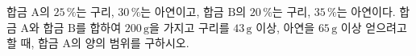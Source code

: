합금 $\mathrm{A}$의 $25\,\%$는 구리, $30\,\%$는 아연이고, 합금 $\mathrm{B}$의 $20\,\%$는 구리, $35\,\%$는 아연이다. 합금 $\mathrm{A}$와 합금 $\mathrm{B}$를 합하여 $200\,\mathrm{g}$을 가지고 구리를 $43\,\mathrm{g}$ 이상, 아연을 $65\,\mathrm{g}$ 이상 얻으려고 할 때, 합금 $\mathrm{A}$의 양의 범위를 구하시오.
